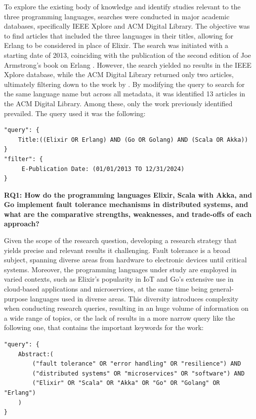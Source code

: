 To explore the existing body of knowledge and identify studies relevant to the three programming languages, searches were conducted in major academic databases, specifically IEEE Xplore and ACM Digital Library. The objective was to find articles that included the three languages in their titles, allowing for Erlang to be considered in place of Elixir. The search was initiated with a starting date of 2013, coinciding with the publication of the second edition of Joe Armstrong's book on Erlang \cite{Armstrong2013}. However, the search yielded no results in the IEEE Xplore database, while the ACM Digital Library returned only two articles, ultimately filtering down to the work by \textcite{Valkov2018}. By modifying the query to search for the same language name but across all metadata, it was identified 13 articles in the ACM Digital Library. Among these, only the work previously identified prevailed. The query used it was the following:

\begin{verbatim}
"query": { 
    Title:((Elixir OR Erlang) AND (Go OR Golang) AND (Scala OR Akka))
}
"filter": {
     E-Publication Date: (01/01/2013 TO 12/31/2024)
}
\end{verbatim}

\textbf{RQ1: How do the programming languages Elixir, Scala with Akka, and Go implement fault tolerance mechanisms in distributed systems, and what are the comparative
    strengths, weaknesses, and trade-offs of each approach?}

Given the scope of the research question, developing a research strategy that yields precise and relevant results it challenging. Fault tolerance is a broad subject, spanning diverse areas from hardware to electronic devices until critical systems. Moreover, the programming languages under study are employed in varied contexts, such as Elixir’s popularity in \gls{IoT} and Go’s extensive use in cloud-based applications and microservices, at the same time being general-purpose languages used in diverse areas. This diversity introduces complexity when conducting research queries, resulting in an huge volume of information on a wide range of topics, or the lack of results in a more narrow query like the following one, that contains the important keywords for the work:

\begin{verbatim}
"query": { 
    Abstract:(
        ("fault tolerance" OR "error handling" OR "resilience") AND
        ("distributed systems" OR "microservices" OR "software") AND 
        ("Elixir" OR "Scala" OR "Akka" OR "Go" OR "Golang" OR "Erlang")
    )
}
\end{verbatim}

